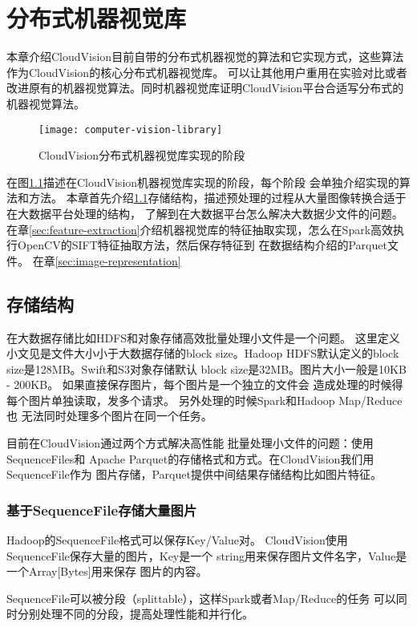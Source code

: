 \chapter{分布式机器视觉库}
\label{cha:distributed_vision_library}
本章介绍CloudVision目前自带的分布式机器视觉的算法和它实现方式，这些算法作为CloudVision的核心分布式机器视觉库。
可以让其他用户重用在实验对比或者改进原有的机器视觉算法。同时机器视觉库证明CloudVision平台合适写分布式的机器视觉算法。
\begin{figure}[h]
  \centering
    \texttt{[image: computer-vision-library]}
  \caption{CloudVision分布式机器视觉库实现的阶段}
  \label{fig:computer-vision-library}
\end{figure}
在图\ref{fig:computer-vision-library}描述在CloudVision机器视觉库实现的阶段，每个阶段
会单独介绍实现的算法和方法。
本章首先介绍\ref{sec:storage_format}存储结构，描述预处理的过程从大量图像转换合适于在大数据平台处理的结构，
了解到在大数据平台怎么解决大数据少文件的问题。
在章\ref{sec:feature-extraction}介绍机器视觉库的特征抽取实现，怎么在Spark高效执行OpenCV的SIFT特征抽取方法，然后保存特征到
在数据结构介绍的Parquet文件。
在章\ref{sec:image-representation}


\section{存储结构}
\label{sec:storage_format}
在大数据存储比如HDFS和对象存储高效批量处理小文件是一个问题。
这里定义小文见是文件大小小于大数据存储的block size。Hadoop
HDFS默认定义的block size是128MB。Swift和S3对象存储默认
block size是32MB。图片大小一般是10KB - 200KB。
如果直接保存图片，每个图片是一个独立的文件会
造成处理的时候得每个图片单独读取，发多个请求。
另外处理的时候Spark和Hadoop Map/Reduce也
无法同时处理多个图片在同一个任务。

目前在CloudVision通过两个方式解决高性能
批量处理小文件的问题：使用SequenceFiles和
Apache Parquet的存储格式和方式。在CloudVision我们用SequenceFile作为
图片存储，Parquet提供中间结果存储结构比如图片特征。


\subsection{基于SequenceFile存储大量图片}
Hadoop的SequenceFile格式可以保存Key/Value对。
CloudVision使用SequenceFile保存大量的图片，Key是一个
string用来保存图片文件名字，Value是一个Array[Bytes]用来保存
图片的内容。

SequenceFile可以被分段（splittable），这样Spark或者Map/Reduce的任务
可以同时分别处理不同的分段，提高处理性能和并行化。

